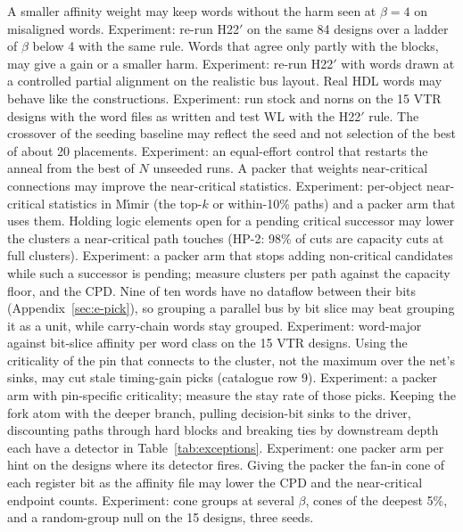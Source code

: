  A smaller affinity weight may keep words without the harm seen at $\beta=4$ on misaligned words. Experiment: re-run H22$'$ on the same 84 designs over a ladder of $\beta$ below 4 with the same rule.
 Words that agree only partly with the blocks, may give a gain or a smaller harm. Experiment: re-run H22$'$ with words drawn at a controlled partial alignment on the realistic bus layout.
 Real HDL words may behave like the constructions. Experiment: run stock and norns on the 15 VTR designs with the word files as written and test WL with the H22$'$ rule.
 The crossover of the seeding baseline may reflect the seed and not selection of the best of about 20 placements. Experiment: an equal-effort control that restarts the anneal from the best of $N$ unseeded runs.
 A packer that weights near-critical connections may improve the near-critical statistics. Experiment: per-object near-critical statistics in M\'{\i}mir (the top-$k$ or within-10\% paths) and a packer arm that uses them.
 Holding logic elements open for a pending critical successor may lower the clusters a near-critical path touches (HP-2: 98\% of cuts are capacity cuts at full clusters). Experiment: a packer arm that stops adding non-critical candidates while such a successor is pending; measure clusters per path against the capacity floor, and the CPD.
 Nine of ten words have no dataflow between their bits (Appendix~\ref{sec:e-pick}), so grouping a parallel bus by bit slice may beat grouping it as a unit, while carry-chain words stay grouped. Experiment: word-major against bit-slice affinity per word class on the 15 VTR designs.
 Using the criticality of the pin that connects to the cluster, not the maximum over the net's sinks, may cut stale timing-gain picks (catalogue row 9). Experiment: a packer arm with pin-specific criticality; measure the stay rate of those picks.
 Keeping the fork atom with the deeper branch, pulling decision-bit sinks to the driver, discounting paths through hard blocks and breaking ties by downstream depth each have a detector in Table~\ref{tab:exceptions}. Experiment: one packer arm per hint on the designs where its detector fires.
 Giving the packer the fan-in cone of each register bit as the affinity file may lower the CPD and the near-critical endpoint counts. Experiment: cone groups at several $\beta$, cones of the deepest 5\%, and a random-group null on the 15 designs, three seeds.

